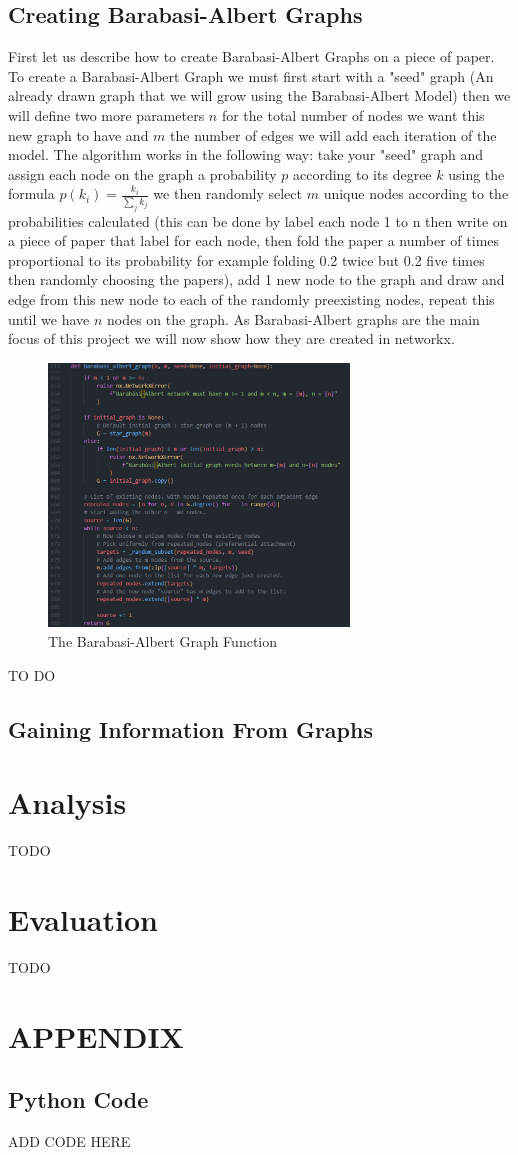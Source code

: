 \documentclass{article}
\begin{document}
        \subsection{Creating Barabasi-Albert Graphs}
        First let us describe how to create Barabasi-Albert Graphs on a piece of paper. To create a Barabasi-Albert Graph we must first start with a "seed" graph (An already drawn graph that we will grow using the Barabasi-Albert Model) then we will define two more parameters $n$ for the total number of nodes we want this new graph to have and $m$ the number of edges we will add each iteration of the model. The algorithm works in the following way: take your "seed" graph and assign each node on the graph a probability $p$ according to its degree $k$ using the formula $p(k_{i}) = \frac{k_{i}}{\sum_{j} {k_{j}}}$ we then randomly select $m$ unique nodes according to the probabilities calculated (this can be done by label each node 1 to n then write on a piece of paper that label for each node, then fold the paper a number of times proportional to its probability for example folding 0.2 twice but 0.2 five times then randomly choosing the papers), add 1 new node to the graph and draw and edge from this new node to each of the randomly preexisting nodes, repeat this until we have $n$ nodes on the graph.
        As Barabasi-Albert graphs are the main focus of this project we will now show how they are created in networkx. 
        \begin{figure}[H]
            \includegraphics[width=8cm]{images/BARABASI_FUNC.png}
            \caption{The Barabasi-Albert Graph Function}
            \label{fig:Barabasi-Albert function1}
        \end{figure}

        TO DO
        \subsection{Gaining Information From Graphs}


    \section{Analysis}
    TODO
    \section{Evaluation}
    TODO
    \section{APPENDIX}
        \subsection{Python Code}
        ADD CODE HERE
        
    
    
\printbibliography
\end{document}
